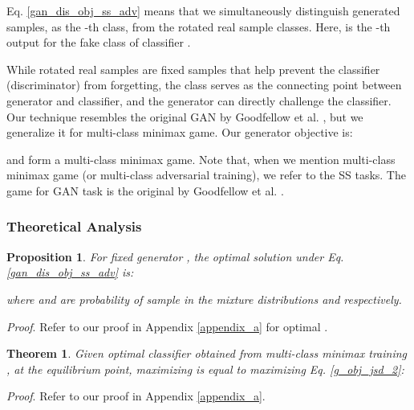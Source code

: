\documentclass{article}
\newtheorem{proposition}{Proposition}
\newtheorem{theorem}{Theorem}
\begin{document}
Eq. \ref{gan_dis_obj_ss_adv} means that we simultaneously distinguish generated samples, as the -th class, from the rotated real sample classes. Here,  is the -th output for the fake class of classifier . 

While rotated real samples are fixed samples that help prevent the classifier (discriminator) from forgetting, the class  serves as the connecting point between generator and classifier, and the generator can directly challenge the classifier. Our technique resembles the original GAN by Goodfellow et al. \cite{goodfellow-nisp-2014}, but we generalize it for multi-class minimax game. Our generator objective is:

 and  form a multi-class minimax game.
Note that, when we mention multi-class minimax game (or multi-class adversarial training), we refer to the SS tasks. The game for GAN task is the original by Goodfellow et al. \cite{goodfellow-nisp-2014}.  

\subsubsection{Theoretical Analysis}

\begin{proposition}
For fixed generator , the optimal solution  under Eq. \ref{gan_dis_obj_ss_adv} is:
 
where  and  are probability of sample  in the mixture distributions  and  respectively.
\label{prop_2}
\end{proposition}

\noindent \textit{Proof}. Refer to our proof in Appendix \ref{appendix_a} for optimal .

\begin{theorem}
Given optimal classifier  obtained from multi-class minimax training , at the equilibrium point, maximizing  is equal to maximizing Eq. \ref{g_obj_jsd_2}:

\label{theorem_2}
\end{theorem}

\noindent \textit{Proof}. Refer to our proof in Appendix \ref{appendix_a}.
\end{document}
